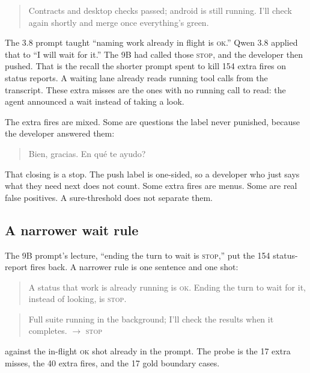 \begin{quote}
\ttfamily\small
Contracts and desktop checks passed; android is still running. I'll
check again shortly and merge once everything's green.
\end{quote}

The 3.8 prompt taught ``naming work already in flight is
\textsc{ok}.'' Qwen 3.8 applied that to ``I will wait for it.'' The
9B had called those \textsc{stop}, and the developer then pushed. That
is the recall the shorter prompt spent to kill 154 extra fires on
status reports. A waiting lane already reads running tool calls from
the transcript. These extra misses are the ones with no running call
to read: the agent announced a wait instead of taking a look.

The extra fires are mixed. Some are questions the label never
punished, because the developer answered them:

\begin{quote}
\ttfamily\small
Bien, gracias. \textquestiondown En qu\'e te ayudo?
\end{quote}

That closing is a stop. The push label is one-sided, so a developer
who just says what they need next does not count. Some extra fires
are menus. Some are real false positives. A sure-threshold does not
separate them.

\subsection{A narrower wait rule}
\label{sec:waitrule}

The 9B prompt's lecture, ``ending the turn to wait is
\textsc{stop},'' put the 154 status-report fires back. A narrower
rule is one sentence and one shot:

\begin{quote}
A status that work is already running is \textsc{ok}. Ending the
turn to wait for it, instead of looking, is \textsc{stop}.
\end{quote}

\begin{quote}
\ttfamily\small
Full suite running in the background; I'll check the results when it
completes. $\rightarrow$ \textsc{stop}
\end{quote}

against the in-flight \textsc{ok} shot already in the prompt. The
probe is the 17 extra misses, the 40 extra fires, and the 17 gold
boundary cases.

